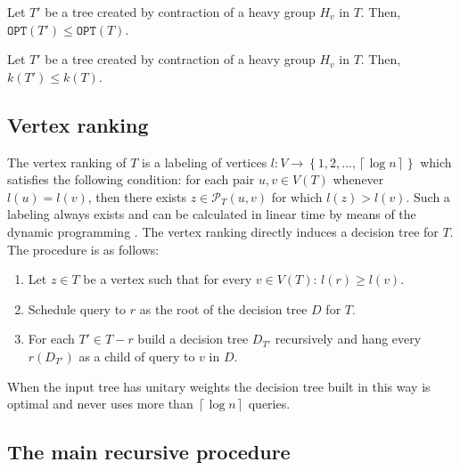 \documentclass[a4paper, anonymous, numberwithinsect, pdfa, UKenglish,cleveref, autoref, thm-restate]{socg-lipics-v2021}
\newcommand{\br}[1]{\left( #1 \right)}
\newcommand{\brc}[1]{\left\{ #1 \right\}}
\newcommand{\cl}[1]{\left\lceil #1 \right\rceil}
\newcommand{\OPT}{\texttt{OPT}}
\begin{document}
\begin{observation}
\label{monotonicityOfOptContraction}
    Let $T'$ be a tree created by contraction of a heavy group $H_v$ in $T$. Then, $\OPT\br{T'}\leq \OPT\br{T}$.
\end{observation}
\begin{observation}\label{monotonicityOfKContracion}
    Let $T'$ be a tree created by contraction of a heavy group $H_v$ in $T$. Then, $k\br{T'}\leq k\br{T}$.
\end{observation}

\subsection{Vertex ranking}\label{vertexRanking}
The vertex ranking of $T$ is a labeling of vertices $l:V\to \brc{1,2,...,\cl{\log n}}$ which satisfies the following condition: for each pair $u,v\in V\br{T}$ whenever $l(u)=l(v)$, then there exists $z\in \mathcal{P}_T\br{u,v}$ for which $l(z)>l(v)$. Such a labeling always exists and can be calculated in linear time by means of the dynamic programming \cite{Schaffer1989OptNodeRankOfTsInLinTime, Mozes_Onak2008FindOptTSStartInLinTime}. 
The vertex ranking directly induces a decision tree for $T$. The procedure is as follows:
\begin{enumerate}
    \item Let $z\in T$ be a vertex such that for every $v\in V\br{T}$: $l\br{r}\geq l\br{v}$.
    \item Schedule query to $r$ as the root of the decision tree $D$ for $T$.
    \item For each $T'\in T-r$ build a decision tree $D_{T'}$ recursively and hang every $r\br{D_{T'}}$ as a child of query to $v$ in $D$.
\end{enumerate}   

When the input tree has unitary weights the decision tree built in this way is optimal and never uses more than $\cl{\log n}$ queries.

\subsection{The main recursive procedure}\label{mainRecursiveProcedure}
\end{document}
